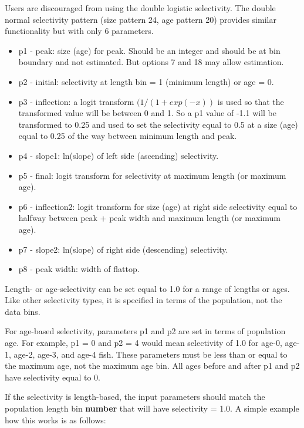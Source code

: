\hypertarget{DoubleLogSelectivity}{}
Users are discouraged from using the double logistic selectivity. The double normal selectivity pattern (size pattern 24, age pattern 20) provides similar functionality but with only 6 parameters.
	\begin{itemize}
		\item p1 - peak: size (age) for peak. Should be an integer and should be at bin boundary and not estimated. But options 7 and 18 may allow estimation.
		\item p2 - initial: selectivity at length bin = 1 (minimum length) or age = 0.
		\item p3 - inflection: a logit transform $(1/(1+exp(-x))$ is used so that the transformed value will be between 0 and 1. So a p1 value of -1.1 will be transformed to 0.25 and used to set the selectivity equal to 0.5 at a size (age) equal to 0.25 of the way between minimum length and peak. 
		\item p4 - slope1: ln(slope) of left side (ascending) selectivity.
		\item p5 - final: logit transform for selectivity at maximum length (or maximum age).
		\item p6 - inflection2: logit transform for size (age) at right side selectivity equal to halfway between peak + peak width and maximum length (or maximum age).
		\item p7 - slope2: ln(slope) of right side (descending) selectivity.
		\item p8 - peak width: width of flattop.
	\end{itemize}

\hypertarget{SelectivityOneRange}{}
Length- or age-selectivity can be set equal to 1.0 for a range of lengths or ages. Like other selectivity types, it is specified in terms of the population, not the data bins.

For age-based selectivity, parameters p1 and p2 are set in terms of population age. For example, p1 = 0 and p2 = 4 would mean selectivity of 1.0 for age-0, age-1, age-2, age-3, and age-4 fish. These parameters must be less than or equal to the maximum age, not the maximum age bin. All ages before and after p1 and p2 have selectivity equal to 0.

If the selectivity is length-based, the input parameters should match the population length bin \textbf{number} that will have selectivity = 1.0. A simple example how this works is as follows:


